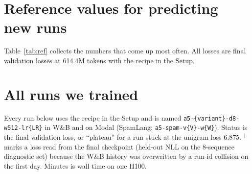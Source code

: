 \documentclass[10pt,letterpaper]{article}
\begin{document}





\section*{Reference values for predicting new runs}
Table~\ref{tab:ref} collects the numbers that come up most often. All losses are final validation losses at 614.4M tokens with the recipe in the Setup.


\section*{All runs we trained}
Every run below uses the recipe in the Setup and is named \texttt{a5-\{variant\}-d8-w512-lr\{LR\}} in W\&B and on Modal (SpamLang: \texttt{a5-spam-v\{V\}-w\{W\}}). Status is the final validation loss, or ``plateau'' for a run stuck at the unigram loss 6.875. $^\dagger$ marks a loss read from the final checkpoint (held-out NLL on the 8-sequence diagnostic set) because the W\&B history was overwritten by a run-id collision on the first day. Minutes is wall time on one H100.

\end{document}
